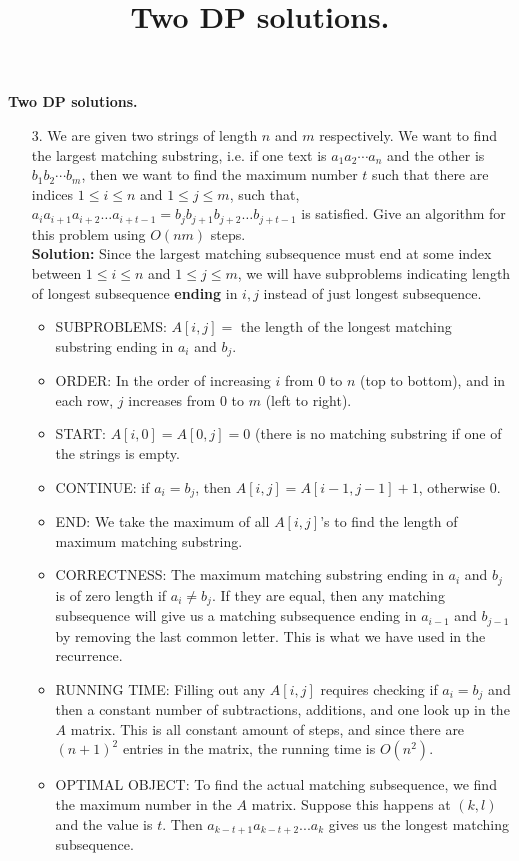 \documentclass{article}
\title{Two DP solutions.}
\begin{document}
\begin{center}
{\bf Two DP solutions.}
\\
\end{center}

\begin{enumerate}


\item[3.] We are given two strings of length $n$ and $m$ respectively. We want to find the largest matching substring, i.e. if one text is $a_1 a_2 \cdots a_n$ and the other is $b_1 b_2 \cdots b_m$, then we want to find the maximum number $t$ such that there are indices $1 \le i \le n$ and $1 \le j \le m$, such that, $a_ia_{i+1} a_{i+2} \ldots a_{i+t-1} = b_jb_{j+1} b_{j+2} \ldots b_{j+t-1}$ is satisfied. Give an algorithm for this problem using $O(n m)$ steps. \\

{\bf Solution:} Since the largest matching subsequence must end at some index between $1\le i \le n$ and $1 \le j \le m$, we will have subproblems indicating length of longest subsequence {\bf ending} in $i,j$ instead of just longest subsequence.
\begin{itemize}
\item SUBPROBLEMS: $A[i,j]=$ the length of the longest matching substring ending in $a_i$ and $b_j$.
\item ORDER: In the order of increasing $i$ from $0$ to $n$ (top to bottom), and in each row, $j$ increases from $0$ to $m$ (left to right).
\item START: $A[i,0]=A[0,j] = 0$ (there is no matching substring if one of the strings is empty.
\item CONTINUE: if $a_i=b_j$, then $A[i,j]=A[i-1,j-1]+1$, otherwise $0$.
\item END: We take the maximum of all $A[i,j]$'s to find the length of maximum matching substring.
\item CORRECTNESS: The maximum matching substring ending in $a_i$ and $b_j$ is of zero length if $a_i \neq b_j$. If they are equal, then any matching subsequence will give us a matching subsequence ending in $a_{i-1}$ and $b_{j-1}$ by removing the last common letter. This is what we have used in the recurrence.
\item RUNNING TIME: Filling out any $A[i,j]$ requires checking if $a_i=b_j$ and then a constant number of subtractions, additions, and one look up in the $A$ matrix. This is all constant amount of steps, and since there are $(n+1)^2$ entries in the matrix, the running time is $O(n^2)$.
\item OPTIMAL OBJECT: To find the actual matching subsequence, we find the maximum number in the $A$ matrix. Suppose this happens at $(k,l)$ and the value is $t$. Then $a_{k-t+1}a_{k-t+2}...a_k$ gives us the longest matching subsequence.
\end{itemize}



\end{enumerate}
\end{document}
